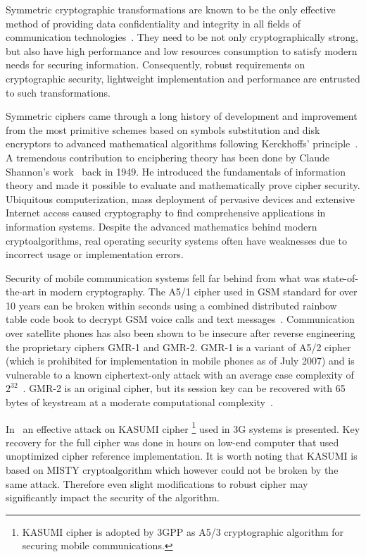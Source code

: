 
\label{sec:intro}

Symmetric cryptographic transformations are known to be the only effective
method of providing data confidentiality and integrity in all fields of
communication technologies~\cite{moldovyan2007innovative}. They need to be not
only cryptographically strong, but also have high performance and low resources
consumption to satisfy modern needs for securing information. Consequently,
robust requirements on cryptographic security, lightweight implementation and
performance are entrusted to such transformations.

Symmetric ciphers came through a long history of development and improvement
from the most primitive schemes based on symbols substitution and disk
encryptors to advanced mathematical algorithms following Kerckhoffs'
principle~\cite{kahn1996codebreakers}.
A tremendous contribution to enciphering theory has been done by Claude
Shannon's work~\cite{shannon:secrecy} back in 1949. He introduced the
fundamentals of information theory and made it possible to evaluate and
mathematically prove cipher security. Ubiquitous computerization, mass
deployment of pervasive devices and extensive Internet access caused
cryptography to find comprehensive applications in information systems. Despite
the advanced mathematics behind modern cryptoalgorithms, real operating
security systems often have weaknesses due to incorrect usage or implementation
errors.

Security of mobile communication systems fell far behind from what was
state-of-the-art in modern cryptography. The A5/1 cipher used in GSM standard
for over 10 years can be broken within seconds using a combined distributed
rainbow table code book to decrypt GSM voice calls and text
messages~\cite{secproject}.
Communication over satellite phones has also been shown to be insecure after
reverse engineering the proprietary ciphers \mbox{GMR-1} and \mbox{GMR-2}.
\mbox{GMR-1} is a variant of A5/2 cipher (which is prohibited for
implementation in mobile phones as of July 2007) and is vulnerable to a known
ciphertext-only attack with an average case complexity of
$2^{32}$~\cite{3gpp:a52:2007}.
\mbox{GMR-2} is an original cipher, but its session key can be recovered with
65 bytes of keystream at a moderate computational
complexity~\cite{kiyanchuk:zuc}.

In~\cite{cryptoeprint-2010-013} an effective attack on KASUMI cipher
\footnote{KASUMI cipher is adopted by 3GPP as A5/3 cryptographic algorithm
for securing mobile communications.}
used in 3G systems is presented. Key recovery for the full cipher was done in
hours on low-end computer that used unoptimized cipher reference implementation.
It is worth noting that KASUMI is based on MISTY cryptoalgorithm which however
could not be broken by the same attack. Therefore even slight modifications to
robust cipher may significantly impact the security of the algorithm.

